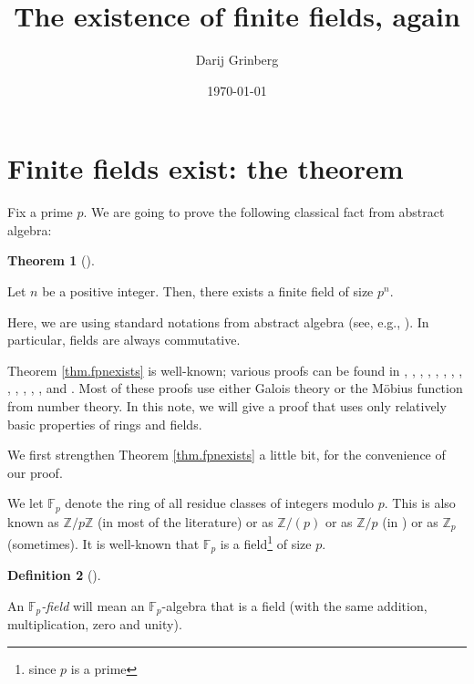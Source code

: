 \documentclass[numbers=enddot,12pt,final,onecolumn,notitlepage]{scrartcl}%
\theoremstyle{definition}
\newtheorem{theo}{Theorem}[subsection]
\newenvironment{theorem}[1][]
{\begin{theo}[#1]\begin{leftbar}}
{\end{leftbar}\end{theo}}
\newtheorem{defi}[theo]{Definition}
\newenvironment{definition}[1][]
{\begin{defi}[#1]\begin{leftbar}}
{\end{leftbar}\end{defi}}
\begin{document}
\title{The existence of finite fields, again}
\author{Darij Grinberg}
\date{
\today
}
\maketitle
\tableofcontents

\section{Finite fields exist: the theorem}

Fix a prime $p$. We are going to prove the following classical fact from
abstract algebra:

\begin{theorem}
\label{thm.fpnexists}Let $n$ be a positive integer. Then, there exists a
finite field of size $p^{n}$.
\end{theorem}

Here, we are using standard notations from abstract algebra (see, e.g.,
\cite{19s}). In particular, fields are always commutative.

Theorem \ref{thm.fpnexists} is well-known; various proofs can be found in
\cite[Theorem 2.5]{LidNie97}, \cite[Theorem 9.14]{Knapp1}, \cite[Exercise
12.126]{Loehr-BC}, \cite[Theorem 2.2]{Conrad-FF}, \cite[Corollary
11.26]{Hungerford}, \cite[Chapter V, Proposition 5.6]{Hungerford-03},
\cite[Theorem 19.3]{Stewar15}, \cite[14.5.1]{Escofi01}, \cite[Corollary
(4.5.3)]{ChaLoi21}, \cite[\S 13.5, Example after Proposition 37]{DumFoo04},
\cite[Theorem 6.5]{HucNeu13}, \cite{MonAno14}, \cite[Theorem 32]{Lange18},
\cite[Chapter 10, Theorem 9]{Murphy12} and \cite[Theorem 6.2.11]{Walker87}.
Most of these proofs use either Galois theory or the M\"{o}bius function from
number theory. In this note, we will give a proof that uses only relatively
basic properties of rings and fields.

We first strengthen Theorem \ref{thm.fpnexists} a little bit, for the
convenience of our proof.

We let $\mathbb{F}_{p}$ denote the ring of all residue classes of integers
modulo $p$. This is also known as $\mathbb{Z}/p\mathbb{Z}$ (in most of the
literature) or as $\mathbb{Z}/\left(  p\right)  $ or as $\mathbb{Z}/p$ (in
\cite{19s}) or as $\mathbb{Z}_{p}$ (sometimes). It is well-known that
$\mathbb{F}_{p}$ is a field\footnote{since $p$ is a prime} of size $p$.

\begin{definition}
An $\mathbb{F}_{p}$\textit{-field} will mean an $\mathbb{F}_{p}$-algebra that
is a field (with the same addition, multiplication, zero and unity).
\end{definition}
\end{document}
